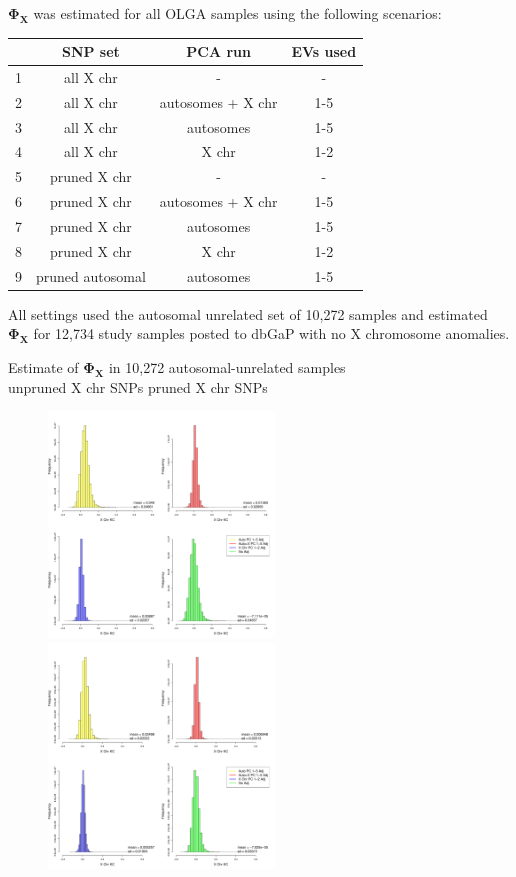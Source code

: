 \documentclass{beamer}
\begin{document}
\begin{frame}
$\mathbf{\Phi_X}$ was estimated for all OLGA samples using the following scenarios:
\begin{table}[ht]
\centering
\begin{tabular}{r|ccc}
  \hline
   &SNP set& PCA run & EVs used \\ 
  \hline
1 &all X chr & - & - \\
2 & all X chr & autosomes + X chr & 1-5 \\
3 & all X chr & autosomes & 1-5\\
4 & all X chr & X chr & 1-2\\ \hline
5 & pruned X chr & - & - \\
6 & pruned X chr & autosomes + X chr & 1-5\\
7 & pruned X chr & autosomes & 1-5\\
8 & pruned X chr & X chr & 1-2 \\
   \hline \hline
9 & pruned autosomal & autosomes & 1-5\\
\end{tabular}
\end{table}
All settings used the autosomal unrelated set of 10,272 samples and estimated $\mathbf{\Phi_X}$ for 12,734 study samples posted to dbGaP with no X chromosome anomalies.
\end{frame}

\begin{frame}
\footnotesize Estimate of $\mathbf{\Phi_X}$ in 10,272 autosomal-unrelated samples \\
unpruned X chr SNPs \hspace{3cm} pruned X chr SNPs
\centering
\begin{figure}
\includegraphics[height=6cm]{../hist_allXchrKC.pdf} \vline
\includegraphics[height=6cm]{../hist_allXPrunedKC.pdf}
\end{figure}
\end{frame}
\end{document}
